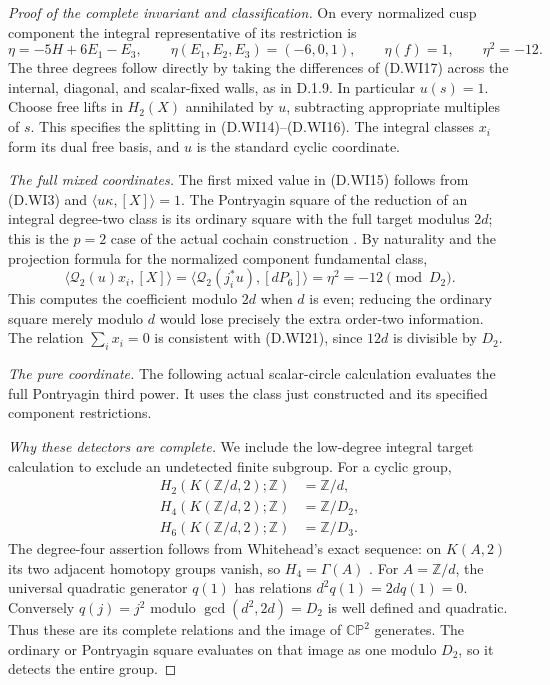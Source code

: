 \begin{proof}[Proof of the complete invariant and classification]
On every normalized cusp component the integral representative
of its restriction is
\[
              \eta=-5H+6E_1-E_3,\qquad
       \eta(E_1,E_2,E_3)=(-6,0,1),\qquad
       \eta(f)=1,\qquad \eta^2=-12.
 \tag{D.WI20}
\]
The three degrees follow directly by taking the differences
of (D.WI17) across the internal, diagonal, and scalar-fixed
walls, as in D.1.9. In particular $u(s)=1$.
Choose free lifts in $H_2(X)$ annihilated by $u$, subtracting
appropriate multiples of $s$. This specifies the splitting
in (D.WI14)--(D.WI16). The integral classes $x_i$ form its
dual free basis, and $u$ is the standard cyclic coordinate.

\emph{The full mixed coordinates.}
The first mixed value in (D.WI15) follows from (D.WI3) and
$\langle u\kappa,[X]\rangle=1$. The Pontryagin square of the
reduction of an integral degree-two class is its ordinary
square with the full target modulus $2d$; this is the
$p=2$ case of the actual cochain construction
\cite[equations (2.1), (2.8), and (3.4), pp.267--268]{ffThomas56}.
By naturality and the projection formula for the normalized
component fundamental class,
\[
 \langle \mathcal Q_2(u)x_i,[X]\rangle
       =\langle\mathcal Q_2(j_i^*u),[dP_6]\rangle
       =\eta^2=-12\pmod {D_2}.
 \tag{D.WI21}
\]
This computes the coefficient modulo $2d$ when $d$ is even;
reducing the ordinary square merely modulo $d$ would lose
precisely the extra order-two information. The relation
$\sum_i x_i=0$ is consistent with (D.WI21), since
$12d$ is divisible by $D_2$.

\emph{The pure coordinate.}
The following actual scalar-circle calculation evaluates
the full Pontryagin third power. It uses the class just
constructed and its specified component restrictions.


\emph{Why these detectors are complete.}
We include the low-degree integral target calculation to
exclude an undetected finite subgroup. For a cyclic group,
\[
 \begin{aligned}
 H_2(K(\mathbb Z/d,2);\mathbb Z)&=\mathbb Z/d,\\
 H_4(K(\mathbb Z/d,2);\mathbb Z)&=\mathbb Z/D_2,\\
 H_6(K(\mathbb Z/d,2);\mathbb Z)&=\mathbb Z/D_3 .
 \end{aligned}
 \tag{D.WI22}
\]
The degree-four assertion follows from Whitehead's exact
sequence: on $K(A,2)$ its two adjacent homotopy groups
vanish, so $H_4=\Gamma(A)$
\cite[Theorem 1 and Section 2]{mapsWhitehead50}.
For $A=\mathbb Z/d$, the universal quadratic generator
$q(1)$ has relations $d^2q(1)=2dq(1)=0$.
Conversely $q(j)=j^2$ modulo $\gcd(d^2,2d)=D_2$
is well defined and quadratic. Thus these are its complete
relations and the image of $\mathbb {CP}^2$ generates.
The ordinary or Pontryagin square evaluates on that image
as one modulo $D_2$, so it detects the entire group.


\end{proof}
